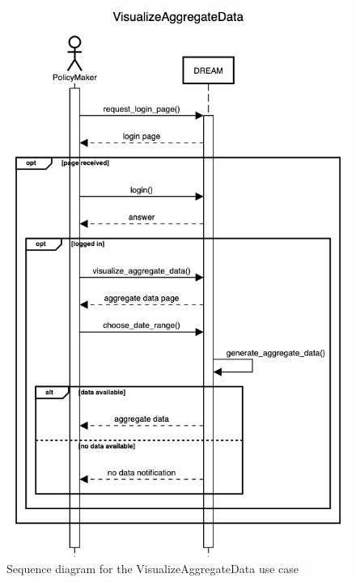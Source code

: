 \documentclass{article}
\begin{document}
\begin{figure}[H]
    \centering
	\includegraphics[scale=0.5]{sequence_diagrams/VisualizeAggregateData}
    \caption{Sequence diagram for the VisualizeAggregateData use case}
\end{figure}


\end{document}
